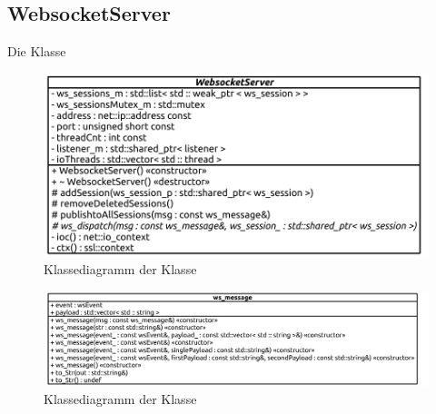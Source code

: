 \subsection{WebsocketServer}
Die Klasse  
\begin{figure}[ht]
  \centering
  \includegraphics[width=\textwidth]{content/hauptteil/umsetzungPoC/backend/uml/classesOfOverview/WebsocketServer.pdf}
  \caption{Klassediagramm der Klasse }
  \label{fig:backend:classDiag:WebsocketServer}
\end{figure}
\begin{figure}[ht]
  \centering
  \includegraphics[width=\textwidth]{content/hauptteil/umsetzungPoC/backend/uml/classesOfOverview/ws_message.pdf}
  \caption{Klassediagramm der Klasse }
  \label{fig:backend:classDiag:wsMsg}
\end{figure}
